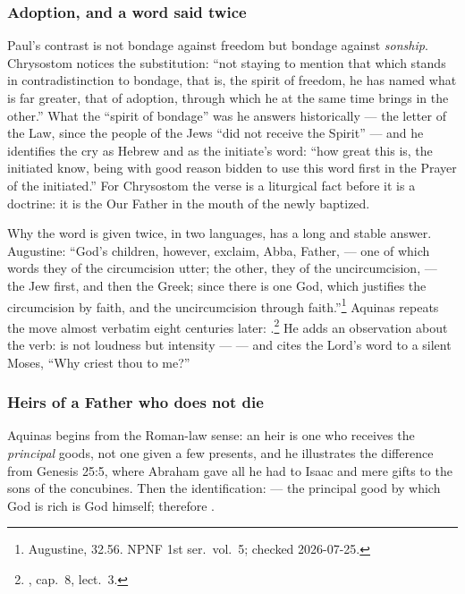 \subsubsection*{Adoption, and a word said twice}

Paul's contrast is not bondage against freedom but bondage against
\emph{sonship}. Chrysostom notices the substitution: ``not staying to mention
that which stands in contradistinction to bondage, that is, the spirit of
freedom, he has named what is far greater, that of adoption, through which he
at the same time brings in the other.'' What the ``spirit of bondage'' was he
answers historically --- the letter of the Law, since the people of the Jews
``did not receive the Spirit'' --- and he identifies the cry  as
Hebrew and as the initiate's word: ``how great this is, the initiated know,
being with good reason bidden to use this word first in the Prayer of the
initiated.'' For Chrysostom the verse is a liturgical fact before it is a
doctrine: it is the Our Father in the mouth of the newly baptized.

Why the word is given twice, in two languages, has a long and stable answer.
Augustine: ``God's children, however, exclaim, Abba, Father, --- one of which
words they of the circumcision utter; the other, they of the uncircumcision,
--- the Jew first, and then the Greek; since there is one God, which justifies
the circumcision by faith, and the uncircumcision through faith.''\footnote{
Augustine,  32.56. NPNF 1st ser.\ vol.\ 5; checked
2026-07-25.} Aquinas repeats the move almost verbatim eight centuries later:
.\footnote{, cap.\ 8, lect.\ 3.} He adds an
observation about the verb:  is not loudness but intensity ---
 ---
and cites the Lord's word to a silent Moses, ``Why criest thou to me?''

\subsubsection*{Heirs of a Father who does not die}

 Aquinas begins from the Roman-law sense: an heir is
one who receives the \emph{principal} goods, not one given a few presents, and
he illustrates the difference from Genesis 25:5, where Abraham gave all he had
to Isaac and mere gifts to the sons of the concubines. Then the identification:
 --- the
principal good by which God is rich is God himself; therefore .

